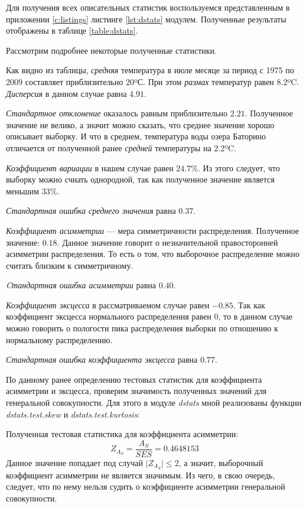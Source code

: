 Для получения всех описательных статистик воспользуемся представленным в приложении \ref{c:listings} листинге \ref{lst:dstats} модулем. Полученные результаты отображены в таблице \ref{table:dstats}.



Рассмотрим подробнее некоторые полученные статистики.

Как видно из таблицы, \textit{средняя} температура в июле месяце за период с 1975 по 2009 составляет приблизительно 20ºС. При этом \textit{размах} температур равен 8.2ºC. \textit{Дисперсия} в данном случае равна $4.91$.

\textit{Стандартное отклонение} оказалось равным приблизительно $2.21$. Полученное значение не велико, а значит можно сказать, что среднее значение хорошо описывает выборку. И что в среднем, температура воды озера Баторино отличается от полученной ранее \textit{средней} температуры на 2.2ºC.

\textit{Коэффициент вариации} в нашем случае равен $24.7\%$. Из этого следует, что выборку можно счиать однородной, так как полученное значение является меньшим 33\%.

\textit{Стандартная ошибка среднего значения} равна $0.37$.

\textit{Коэффициент асимметрии} --- мера симметричности распределения. Полученное значение: $0.18$. Данное значение говорит о незначительной правосторонней асимметрии распределения. То есть о том, что выборочное распределение можно считать близким к симметричному.

\textit{Cтандартная ошибка асимметрии} равна $0.40$.

\textit{Коэффициент эксцесса} в рассматриваемом случае равен $-0.85$. Так как коэффициент эксцесса нормального распределения равен $0$, то в данном случае можно говорить о пологости пика распределения выборки по отношению к нормальному распределению. 

\textit{Стандартная ошибка коэффициента эксцесса} равна $0.77$. 

По данному ранее определению тестовых статистик для коэффициента асимметрии и эксцесса, проверим значимость полученных значений для генеральной совокупности. Для этого в модуле \textit{dstats} мной реализованы функции \textit{dstats.test.skew} и \textit{dstats.test.kurtosis}:

Полученная тестовая статистика для коэффициента асимметрии:
\begin{equation*}
	Z_{A_S} = \frac{A_S}{SES} = 0.4648153
\end{equation*}
Данное значение попадает под случай $\vert Z_{A_S} \vert \le 2$, а значит, выборочный коэффициент асимметрии не является значимым. Из чего, в свою очередь, следует, что по нему нельзя судить о коэффициенте асимметрии генеральной совокупности.

